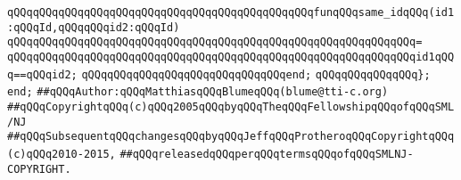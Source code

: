 \newline
\verb|qQQqqQQqqQQqqQQqqQQqqQQqqQQqqQQqqQQqqQQqqQQqqQQqfunqQQqsame_idqQQq(id1:qQQqId,qQQqqQQqid2:qQQqId)|\newline
\verb|qQQqqQQqqQQqqQQqqQQqqQQqqQQqqQQqqQQqqQQqqQQqqQQqqQQqqQQqqQQqqQQq=|\newline
\verb|qQQqqQQqqQQqqQQqqQQqqQQqqQQqqQQqqQQqqQQqqQQqqQQqqQQqqQQqqQQqqQQqid1qQQq==qQQqid2;|\newline
\verb|qQQqqQQqqQQqqQQqqQQqqQQqqQQqqQQqend;|\newline
\verb|qQQqqQQqqQQqqQQq};|\newline
\verb|end;|\newline
\newline
\verb|##qQQqAuthor:qQQqMatthiasqQQqBlumeqQQq(blume@tti-c.org)|\newline
\verb|##qQQqCopyrightqQQq(c)qQQq2005qQQqbyqQQqTheqQQqFellowshipqQQqofqQQqSML/NJ|\newline
\verb|##qQQqSubsequentqQQqchangesqQQqbyqQQqJeffqQQqProtheroqQQqCopyrightqQQq(c)qQQq2010-2015,|\newline
\verb|##qQQqreleasedqQQqperqQQqtermsqQQqofqQQqSMLNJ-COPYRIGHT.|\newline

